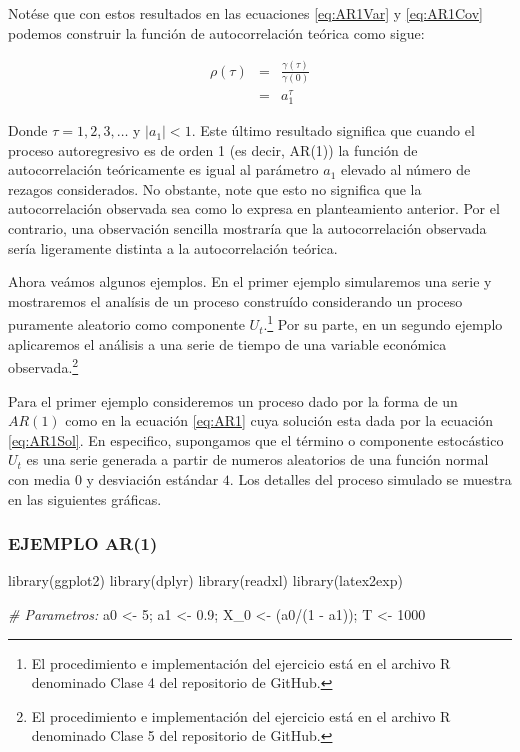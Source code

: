 \documentclass[
]{book}
\newenvironment{Shaded}{\begin{snugshade}}{\end{snugshade}}
\newcommand{\CommentTok}[1]{\textcolor[rgb]{0.56,0.35,0.01}{\textit{#1}}}
\newcommand{\DecValTok}[1]{\textcolor[rgb]{0.00,0.00,0.81}{#1}}
\newcommand{\FloatTok}[1]{\textcolor[rgb]{0.00,0.00,0.81}{#1}}
\newcommand{\FunctionTok}[1]{\textcolor[rgb]{0.00,0.00,0.00}{#1}}
\newcommand{\NormalTok}[1]{#1}
\newcommand{\OtherTok}[1]{\textcolor[rgb]{0.56,0.35,0.01}{#1}}
\newcommand{\SpecialCharTok}[1]{\textcolor[rgb]{0.00,0.00,0.00}{#1}}
\begin{document}
Notése que con estos resultados en las ecuaciones \eqref{eq:AR1Var} y
\eqref{eq:AR1Cov} podemos construir la función de autocorrelación teórica
como sigue:

\begin{eqnarray}
\rho(\tau) & = & \frac{\gamma(\tau)}{\gamma(0)} \nonumber \\
    & = & a_1^\tau
    \label{eq:emi1}
\end{eqnarray}

Donde \(\tau = 1, 2, 3, \ldots\) y \(\lvert a_1 \lvert < 1\). Este último
resultado significa que cuando el proceso autoregresivo es de orden 1
(es decir, AR(1)) la función de autocorrelación teóricamente es igual al
parámetro \(a_1\) elevado al número de rezagos considerados. No obstante,
note que esto no significa que la autocorrelación observada sea como lo
expresa en planteamiento anterior. Por el contrario, una observación
sencilla mostraría que la autocorrelación observada sería ligeramente
distinta a la autocorrelación teórica.

Ahora veámos algunos ejemplos. En el primer ejemplo simularemos una
serie y mostraremos el analísis de un proceso construído considerando un
proceso puramente aleatorio como componente \(U_t\).\footnote{El procedimiento e implementación del ejercicio
  está en el archivo R denominado Clase 4 del repositorio de GitHub.}
Por su parte, en un segundo ejemplo aplicaremos el análisis a una serie
de tiempo de una variable económica observada.\footnote{El procedimiento e implementación del ejercicio
  está en el archivo R denominado Clase 5 del repositorio de GitHub.}

Para el primer ejemplo consideremos un proceso dado por la forma de un
\(AR(1)\) como en la ecuación \eqref{eq:AR1} cuya solución esta dada por la
ecuación \eqref{eq:AR1Sol}. En especifico, supongamos que el término o
componente estocástico \(U_t\) es una serie generada a partir de numeros
aleatorios de una función normal con media \(0\) y desviación estándar
\(4\). Los detalles del proceso simulado se muestra en las siguientes
gráficas.

\hypertarget{ejemplo-ar1}{%
\subsubsection{EJEMPLO AR(1)}\label{ejemplo-ar1}}

\begin{Shaded}
\begin{Highlighting}[]
\FunctionTok{library}\NormalTok{(ggplot2)}
\FunctionTok{library}\NormalTok{(dplyr)}
\FunctionTok{library}\NormalTok{(readxl)}
\FunctionTok{library}\NormalTok{(latex2exp)}

\CommentTok{\# Parametros:}
\NormalTok{a0 }\OtherTok{\textless{}{-}} \DecValTok{5}\NormalTok{; a1 }\OtherTok{\textless{}{-}} \FloatTok{0.9}\NormalTok{; X\_0 }\OtherTok{\textless{}{-}}\NormalTok{ (a0}\SpecialCharTok{/}\NormalTok{(}\DecValTok{1} \SpecialCharTok{{-}}\NormalTok{ a1)); T }\OtherTok{\textless{}{-}} \DecValTok{1000}
\end{Highlighting}
\end{Shaded}
\end{document}
